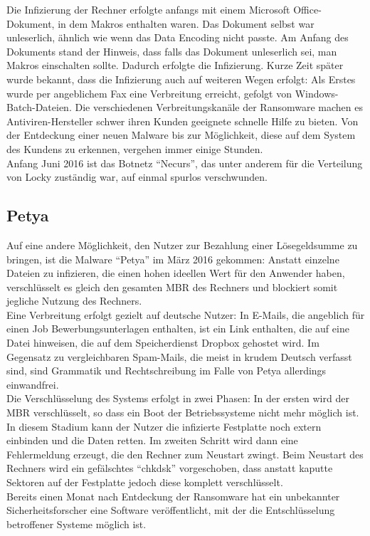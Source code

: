 Die Infizierung der Rechner erfolgte anfangs mit einem Microsoft Office-Dokument, in dem Makros enthalten waren\cite{locky:infection}. Das Dokument selbst war unleserlich, ähnlich wie wenn das Data Encoding nicht passte. Am Anfang des Dokuments stand der Hinweis, dass falls das Dokument unleserlich sei, man Makros einschalten sollte. Dadurch erfolgte die Infizierung. Kurze Zeit später wurde bekannt, dass die Infizierung auch auf weiteren Wegen erfolgt: Als Erstes wurde per angeblichem Fax eine Verbreitung erreicht\cite{locky:fax}, gefolgt von Windows-Batch-Dateien\cite{locky:batch}. Die verschiedenen Verbreitungskanäle der Ransomware machen es Antiviren-Hersteller schwer ihren Kunden geeignete schnelle Hilfe zu bieten. Von der Entdeckung einer neuen Malware bis zur Möglichkeit, diese auf dem System des Kundens zu erkennen, vergehen immer einige Stunden.\\

Anfang Juni 2016\cite{locky:end} ist das Botnetz ``Necurs'', das unter anderem für die Verteilung von Locky zuständig war, auf einmal spurlos verschwunden.

		
\subsection{Petya}
Auf eine andere Möglichkeit, den Nutzer zur Bezahlung einer Lösegeldsumme zu bringen, ist die Malware ``Petya'' im März 2016 gekommen: Anstatt einzelne Dateien zu infizieren, die einen hohen ideellen Wert für den Anwender haben, verschlüsselt es gleich den gesamten MBR des Rechners und blockiert somit jegliche Nutzung des Rechners\cite{petya:start}.\\
Eine Verbreitung erfolgt gezielt auf deutsche Nutzer: In E-Mails, die angeblich für einen Job Bewerbungsunterlagen enthalten, ist ein Link enthalten, die auf eine Datei hinweisen, die auf dem Speicherdienst Dropbox gehostet wird. Im Gegensatz zu vergleichbaren Spam-Mails, die meist in krudem Deutsch verfasst sind, sind Grammatik und Rechtschreibung im Falle von Petya allerdings einwandfrei.\\
Die Verschlüsselung des Systems erfolgt in zwei Phasen\cite{petya:stop}: In der ersten wird der MBR verschlüsselt, so dass ein Boot der Betriebssysteme nicht mehr möglich ist. In diesem Stadium kann der Nutzer die infizierte Festplatte noch extern einbinden und die Daten retten. Im zweiten Schritt wird dann eine Fehlermeldung erzeugt, die den Rechner zum Neustart zwingt. Beim Neustart des Rechners wird ein gefälschtes ``chkdsk'' vorgeschoben, dass anstatt kaputte Sektoren auf der Festplatte jedoch diese komplett verschlüsselt.\\
Bereits einen Monat nach Entdeckung der Ransomware hat ein unbekannter Sicherheitsforscher eine Software veröffentlicht, mit der die Entschlüsselung betroffener Systeme möglich ist\cite{petya:end}.